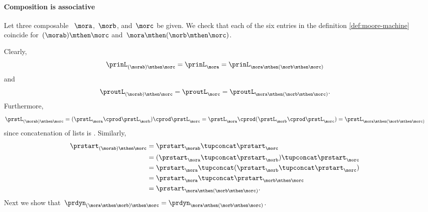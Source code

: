 {\paragraph{Composition is associative}

Let three composable ~$\mora$,~$\morb$, and~$\morc$ be given.
We check that each of the six entries in the definition \cref{def:moore-machine} coincide for~$(\morab) \mthen \morc$ and~$\mora \mthen (\morb \mthen \morc)$.

Clearly,
\begin{equation}
    \label{eq:moore_assoc_input}
    \prinL_{(\morab)\mthen \morc} = \prinL_{\mora} =\prinL_{\mora \mthen (\morb \mthen \morc)}
\end{equation}
and
\begin{equation}
    \label{eq:moore_assoc_output}
    \proutL_{(\morab)\mthen \morc} =\proutL_\morc = \proutL_{\mora \mthen (\morb \mthen \morc)}.
\end{equation}
Furthermore,
\begin{equation}
    \label{eq:moore_assoc_state}
    \prstL_{(\morab)\mthen \morc} = (\prstL_{\mora} \cprod \prstL_{\morb}) \cprod \prstL_{\morc} = \prstL_{\mora} \cprod (\prstL_{\morb} \cprod \prstL_{\morc}) =\prstL_{\mora \mthen (\morb \mthen \morc)}
\end{equation}
since concatenation of lists is .
Similarly,
\begin{equation}
    \label{eq:moore_assoc_start}
    \begin{aligned}
        \prstart_{(\morab)\mthen \morc} & = \prstart_{\morab} \tupconcat \prstart_{\morc} \\
                                        & = (\prstart_{\mora } \tupconcat \prstart_{\morb}) \tupconcat \prstart_{\morc} \\
                                        & = \prstart_{\mora } \tupconcat (\prstart_{\morb} \tupconcat \prstart_{\morc}) \\
                                        & = \prstart_{\mora } \tupconcat \prstart_{ \morb \mthen\morc} \\
                                        & = \prstart_{\mora \mthen (\morb \mthen \morc)}.
    \end{aligned}
\end{equation}
Next we show that~$\prdyn_{(\mora \mthen \morb)\mthen \morc} = \prdyn_{\mora \mthen (\morb \mthen \morc)}$.

}
